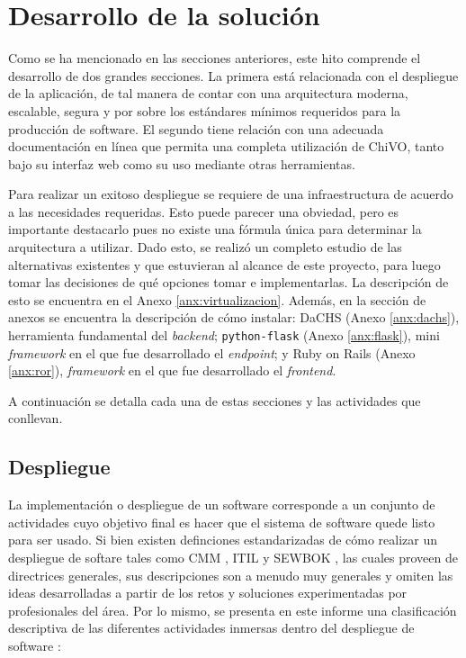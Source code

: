 \section{Desarrollo de la solución}

Como se ha mencionado en las secciones anteriores, este hito comprende el desarrollo de dos grandes secciones. La primera está relacionada con el despliegue de la aplicación, de tal manera de contar con una arquitectura moderna, escalable, segura y por sobre los estándares mínimos requeridos para la producción de software. El segundo tiene relación con una adecuada documentación en línea que permita una completa utilización de ChiVO, tanto bajo su interfaz web como su uso mediante otras herramientas.

Para realizar un exitoso despliegue se requiere de una infraestructura de acuerdo a las necesidades requeridas. Esto puede parecer una obviedad, pero es importante destacarlo pues no existe una fórmula única para determinar la arquitectura a utilizar. Dado esto, se realizó un completo estudio de las alternativas existentes y que estuvieran al alcance de este proyecto, para luego tomar las decisiones de qu\'e opciones tomar e implementarlas. La descripción de esto se encuentra en el Anexo \ref{anx:virtualizacion}. Además, en la sección de anexos se encuentra la descripción de cómo instalar: DaCHS (Anexo \ref{anx:dachs}), herramienta fundamental del \emph{backend}; \texttt{python-flask} (Anexo \ref{anx:flask}), mini \emph{framework} en el que fue desarrollado el \emph{endpoint}; y Ruby on Rails (Anexo \ref{anx:ror}), \emph{framework} en el que fue desarrollado el \emph{frontend}.

A continuación se detalla cada una de estas secciones y las actividades que conllevan.

\subsection{Despliegue}

La implementación o despliegue de un software corresponde a un conjunto de actividades cuyo objetivo final es hacer que el sistema de software quede listo para ser usado. Si bien existen definciones estandarizadas de cómo realizar un despliegue de softare tales como CMM \cite{cmm}, ITIL \cite{itil} y SEWBOK \cite{swebok}, las cuales proveen de directrices generales, sus descripciones son a menudo muy generales y omiten las ideas desarrolladas a partir de los retos y soluciones experimentadas por profesionales del área. Por lo mismo, se presenta en este informe una clasificación descriptiva de las diferentes actividades inmersas dentro del despliegue de software \cite{deployActivities}:

